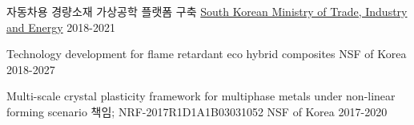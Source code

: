 \begin{cvhonors}

  \cvhonor
  {자동차용 경량소재 가상공학 플랫폼 구축}
  {}
  {\href{http://www.motie.go.kr/www/main.do}{South Korean Ministry of Trade, Industry and Energy}}
  {2018-2021}


  \cvhonor
  {Technology development for flame retardant eco hybrid composites}
  {}
  {NSF of Korea}
  {2018-2027}

  \cvhonor
  {Multi-scale crystal plasticity framework for multiphase metals under non-linear forming scenario} %
  {책임; NRF-2017R1D1A1B03031052}%
  {NSF of Korea} %
  {2017-2020} %

\end{cvhonors}